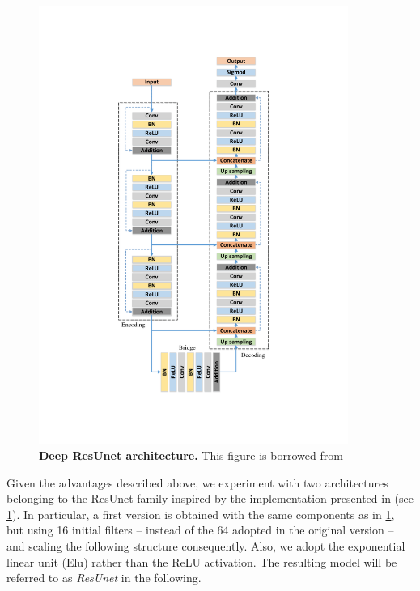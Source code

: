 \begin{figure}
\centerline{
\includegraphics[width=0.9\textwidth]{figures/130_methods/resunet.pdf}
}
\caption{\textbf{Deep ResUnet architecture.}
This figure is borrowed from \protect \cite{deep_resunet}
} \label{fig:resunet_architecture}
\end{figure}
Given the advantages described above, we experiment with two architectures belonging to the ResUnet family inspired by the implementation presented in  (see \cref{fig:resunet_architecture}).
In particular, a first version is obtained with the same components as in \cref{fig:resunet_architecture}, but using 16 initial filters -- instead of the 64 adopted in the original version \cite{deep_resunet} -- and scaling the following structure consequently.
Also, we adopt the exponential linear unit (Elu) \cite{clevert2015elu} rather than the ReLU activation.
The resulting model will be referred to as \textit{ResUnet} in the following.

